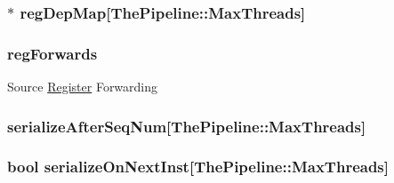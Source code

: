 \label{classUseDefUnit_a899b1bc10d38a0f725495bf2108479a3}
\hypertarget{classUseDefUnit_aa0933c90c5ced66e85669c2982b165a6}{
\subsubsection[{regDepMap}]{$\ast$ {\bf regDepMap}\mbox{[}{\bf ThePipeline::MaxThreads}\mbox{]}}}
\label{classUseDefUnit_aa0933c90c5ced66e85669c2982b165a6}
\hypertarget{classUseDefUnit_a37cb2ded859693943151bfb454bcc97f}{
\subsubsection[{regForwards}]{ {\bf regForwards}}}
\label{classUseDefUnit_a37cb2ded859693943151bfb454bcc97f}
Source \hyperlink{classRegister}{Register} Forwarding \hypertarget{classUseDefUnit_a699cfb06a053ac682026566662b62453}{
\subsubsection[{serializeAfterSeqNum}]{ {\bf serializeAfterSeqNum}\mbox{[}{\bf ThePipeline::MaxThreads}\mbox{]}}}
\label{classUseDefUnit_a699cfb06a053ac682026566662b62453}
\hypertarget{classUseDefUnit_ad4300fb3f2f2ddebbfd44bbcad133c56}{
\subsubsection[{serializeOnNextInst}]{\setlength{\rightskip}{0pt plus 5cm}bool {\bf serializeOnNextInst}\mbox{[}{\bf ThePipeline::MaxThreads}\mbox{]}}}
